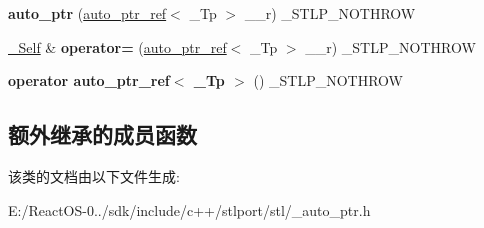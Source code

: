 \begin{DoxyCompactItemize}
{\bfseries auto\+\_\+ptr} (\hyperlink{classauto__ptr__ref}{auto\+\_\+ptr\+\_\+ref}$<$ \+\_\+\+Tp $>$ \+\_\+\+\_\+r) \+\_\+\+S\+T\+L\+P\+\_\+\+N\+O\+T\+H\+R\+OW
\item 
\mbox{\label{classauto__ptr_ad5d4ab9357c689e3c6a227724f2d97ac}} 
\hyperlink{classauto__ptr}{\+\_\+\+Self} \& {\bfseries operator=} (\hyperlink{classauto__ptr__ref}{auto\+\_\+ptr\+\_\+ref}$<$ \+\_\+\+Tp $>$ \+\_\+\+\_\+r) \+\_\+\+S\+T\+L\+P\+\_\+\+N\+O\+T\+H\+R\+OW
\item 
\mbox{\label{classauto__ptr_acbb19d56c4513c36e069d092cb1b2fb4}} 
{\bfseries operator auto\+\_\+ptr\+\_\+ref$<$ \+\_\+\+Tp $>$} () \+\_\+\+S\+T\+L\+P\+\_\+\+N\+O\+T\+H\+R\+OW
\end{DoxyCompactItemize}
\subsection*{额外继承的成员函数}


该类的文档由以下文件生成\+:\begin{DoxyCompactItemize}
\item 
E\+:/\+React\+O\+S-\/0../sdk/include/c++/stlport/stl/\+\_\+auto\+\_\+ptr.\+h\end{DoxyCompactItemize}
